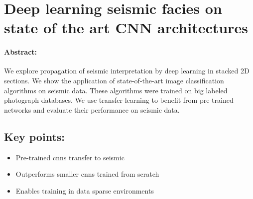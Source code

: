 \section{Deep learning seismic facies on state of the art CNN architectures}

\paragraph{Abstract:} We explore propagation of seismic interpretation by deep learning in stacked 2D sections. We show the application of state-of-the-art image classification algorithms on seismic data. These algorithms were trained on big labeled photograph databases. We use transfer learning to benefit from pre-trained networks and evaluate their performance on seismic data.
\vfill
\subsection*{Key points:}
\begin{itemize}
    \item Pre-trained \aclp{cnn} transfer to seismic
    \item Outperforms smaller \acp{cnn} trained from scratch
    \item Enables training in data sparse environments
\end{itemize}
\vfill
{\vfill\hfill\newline{}}


